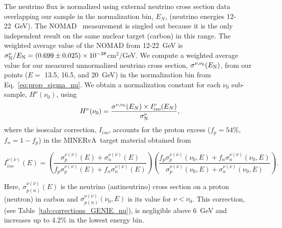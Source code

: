 \documentclass[aps,preprint,showpacs,superscriptaddress,linenumbers,nofootinbib,prd,12pt]{revtex4}
\newcommand{\minerva}{MINERvA\xspace}
\newcommand{\realhnu}{\ensuremath{H^{\nu}(\nu_0)}}
\begin{document}
The neutrino flux is normalized using external neutrino cross section data
overlapping our sample in the normalization bin, $E_N$, (neutrino 
energies 12-22~GeV). The NOMAD~\cite{Wu:2007ab} measurement is singled
out because it is the only independent result on the same 
nuclear target (carbon) in this range. The weighted average 
value of the NOMAD from 12-22~GeV is
$\sigma_{\rm N}^{\nu}/E_{\rm N}= (0.699\pm0.025) \times 10^{-38}$cm$^{2}$/GeV.
We compute a weighted average value for our measured
unnormalized neutrino cross section, $\sigma^{\nu,\nu_0}(E_{\rm N})$,
from our points ($E=$ 13.5, 16.5, and 20~GeV) in the normalization bin
from Eq.~\eqref{eq:prop_sigma_nu}.
We obtain a normalization constant for each $\nu_0$ sub-sample, \realhnu{}, using 
\begin{equation}
\realhnu{}=\frac{\sigma^{\nu,\nu_0}(E_N) \times I^{\nu}_{iso}( E_N)}{\sigma^{\nu}_{\rm N}},
\label{eq:hnu}
\end{equation}
where the isoscalar correction, $I_{iso}$, accounts for the proton excess
($f_{p}=54\%$, $f_n=1-f_p$) in the \minerva\ target material obtained from
\begin{widetext}
\begin{equation}
I_{iso}^{\nu(\bar{\nu})}(E)=\left(\frac{\sigma_{p}^{\nu(\bar{\nu})}(E)+ \sigma_{n}^{\nu(\bar{\nu})}(E)}{f_{p} \sigma_{p}^{\nu(\bar{\nu})}(E)+f_{n} \sigma_{n}^{\nu(\bar{\nu})}(E)}\right) \left(\frac{f_{p} \sigma_{p}^{\nu(\bar{\nu})}(\nu_0,E)+f_{n} \sigma_{n}^{\nu(\bar{\nu})}(\nu_0,E)}{\sigma_{p}^{\nu(\bar{\nu})}(\nu_0,E)+ \sigma_{n}^{\nu(\bar{\nu})}(\nu_0,E)}\right).
\label{eq:iiso}
\end{equation}
\end{widetext}
Here, $\sigma_{p(n)}^{\nu(\bar{\nu})}(E)$ is the neutrino (antineutrino) cross section on a proton (neutron) in carbon and $\sigma_{p(n)}^{\nu(\bar{\nu})}(\nu_{0},E)$ is its value for $\nu<\nu_{0}$.
This correction, (see Table~\ref{tab:corrections_GENIE_nu}),
is negligible above 6~GeV and increases up to 4.2\% in the lowest energy bin.
\end{document}
